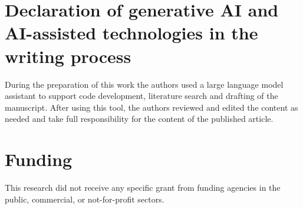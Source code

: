 \documentclass[preprint,review,12pt]{elsarticle}
\begin{document}
\section*{Declaration of generative AI and AI-assisted technologies in the writing process}
During the preparation of this work the authors used a large language model assistant to support code development, literature search and drafting of the manuscript. After using this tool, the authors reviewed and edited the content as needed and take full responsibility for the content of the published article.

\section*{Funding}
This research did not receive any specific grant from funding agencies in the public, commercial, or not-for-profit sectors.



\end{document}
